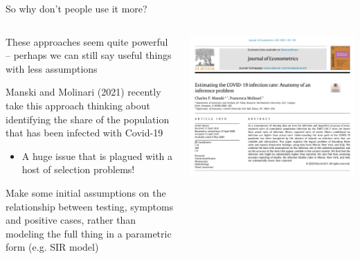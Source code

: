 \documentclass[notes,11pt, aspectratio=169]{beamer}
\newenvironment{wideitemize}{\itemize\addtolength{\itemsep}{10pt}}{\enditemize}
\begin{document}
\begin{frame}{So why don't people use it more?}
      \begin{columns}[onlytextwidth, T] %
        \begin{column}{.5\textwidth}
          \begin{wideitemize}
          \item These approaches seem quite powerful -- perhaps we can
            still say useful things with less assumptions
          \item Manski and Molinari (2021) recently take this approach
            thinking about identifying the share of the population
            that has been infected with Covid-19
            \begin{itemize}
            \item A huge issue that is plagued with a host of selection problems!
            \end{itemize}
          \item Make some initial assumptions on the relationship
            between testing, symptoms and positive cases, rather than
            modeling the full thing in a parametric form (e.g. SIR
            model)
          \end{wideitemize}
      \end{column}%
      \hfill%
      \begin{column}{.5\textwidth}
        \includegraphics[width=\linewidth]{images/manski_molinari_1.png}
      \end{column}%
    \end{columns}

  \end{frame}
\end{document}
